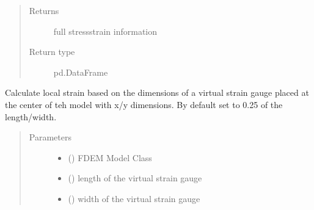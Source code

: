 \documentclass[letterpaper,10pt,english]{sphinxmanual}
\begin{document}
\begin{fulllineitems}
\begin{quote}
\begin{description}
\begin{itemize}
\end{itemize}

\item[{Returns}] \leavevmode
full stress\sphinxhyphen{}strain information

\item[{Return type}] \leavevmode
pd.DataFrame

\end{description}\end{quote}

\end{fulllineitems}


\begin{fulllineitems}
\label{\detokenize{openfdem:openfdem.complete_BD_thread_pool_generators.set_strain_gauge}}
Calculate local strain based on the dimensions of a virtual strain gauge placed at the center of teh model with
x/y dimensions. By default set to 0.25 of the length/width.
\begin{quote}\begin{description}
\item[{Parameters}] \leavevmode\begin{itemize}
\item {} 
 ({\hyperref[\detokenize{openfdem:openfdem.openfdem.Model}]{}}) \textendash{} FDEM Model Class

\item {} 
 () \textendash{} length of the virtual strain gauge

\item {} 
 () \textendash{} width of the virtual strain gauge


\end{itemize}
\end{description}
\end{quote}
\end{fulllineitems}
\end{document}
